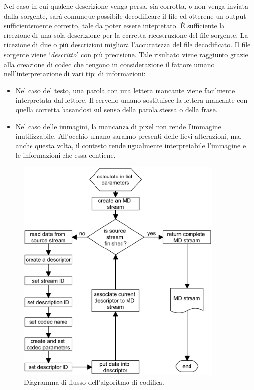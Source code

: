 Nel caso in cui qualche descrizione venga persa, sia corrotta, o non venga
inviata dalla sorgente, sarà comunque possibile decodificare il file ed
otterene un output sufficientemente corretto, tale da poter essere intepretato. \`E sufficiente la ricezione di una sola descrizione per la corretta ricostruzione del file sorgente. La ricezione di due o più descrizioni migliora l'accuratezza del file decodificato. Il file sorgente viene `\emph{descritto}' con più precisione.  Tale risultato viene raggiunto grazie alla creazione di codec che tengono in considerazione il fattore umano nell'interpretazione di vari tipi di informazioni:
\begin{itemize}
 \item Nel caso del testo, una parola con una lettera mancante viene facilmente interpretata dal lettore. Il cervello umano sostituisce la lettera mancante con quella corretta basandosi sul senso della parola stessa o della frase.
 \item Nel caso delle immagini, la mancanza di pixel non rende l'immagine inutilizzabile. All'occhio umano saranno presenti delle lievi alterazioni, ma, anche questa volta, il contesto rende ugualmente interpretabile l'immagine e le informazioni che essa contiene.
\end{itemize}

\begin{figure}[ht]
\centering \includegraphics[width=0.90\textwidth]{../images/codifica.png}
	\caption{Diagramma di flusso dell'algoritmo di codifica.}
	\label{fig:codifica}
\end{figure}

